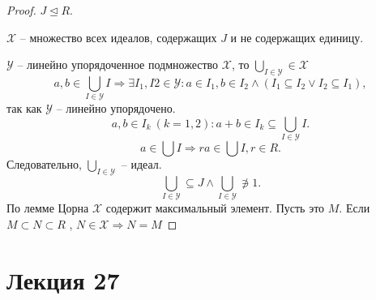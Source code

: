 \documentclass[11pt]{book}
\theoremstyle{definition}
\theoremstyle{plain}
\theoremstyle{plain}
\theoremstyle{definition}
\theoremstyle{remark}
\begin{document}
\begin{proof}
    $ J \trianglelefteq R$. %

    $ \mathcal{X}$ -- множество всех идеалов, содержащих $ J$ и не содержащих единицу.

    $\mathcal{Y}$ -- линейно упорядоченное подмножество $ \mathcal{X}$, то $ \bigcup_{I \in \mathcal{Y}} \in \mathcal{X}$
    \[
	a, b \in  \bigcup_{I \in \mathcal{Y}} I \Longrightarrow \exists I_1, I 2 \in \mathcal{Y}: a \in  I_1, b \in I_2 \wedge (I_1 \subseteq I_2 \vee I_2 \subseteq I_1) 
    ,\] 
    так как $\mathcal{Y}$ -- линейно упорядочено.
    \[
	a, b \in  I_k ~(k = 1, 2): a+b \in  I_k \subseteq \bigcup_{I \in \mathcal{Y}}  I
    .\] 
    \[
    a \in  \bigcup I \Longrightarrow ra \in  \bigcup I, r \in  R
    .\] 
    Следовательно, $ \bigcup_{I \in \mathcal{Y}}  $ -- идеал.
    \[
    \bigcup_{I \in\mathcal{Y}} \subseteq J \wedge \bigcup_{ I \in \mathcal{Y}} \not\ni 1 
    .\] 
    По лемме Цорна $ \mathcal{X}$ содержит максимальный элемент. Пусть это $ M$.
    Если $ M \subset N \subset R$ %
    , $ N \in  \mathcal{X} \Rightarrow  N = M$
\end{proof}
\section{Лекция 27}
\end{document}
